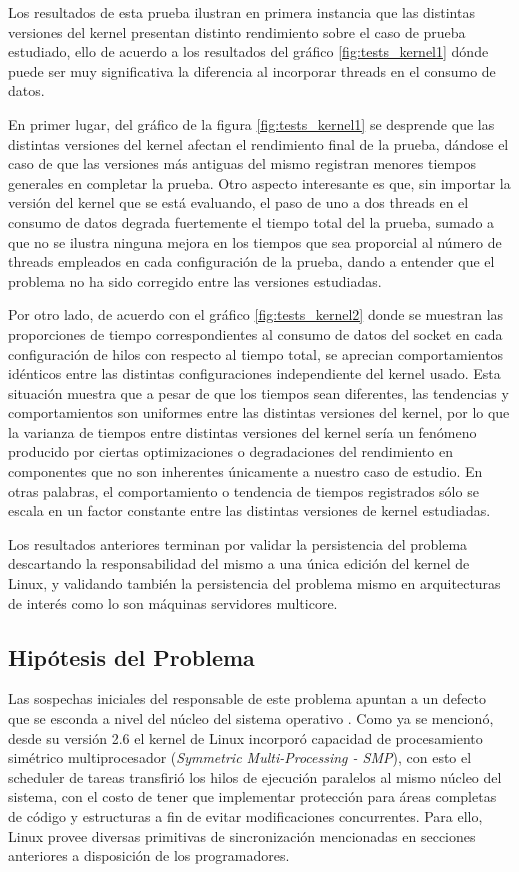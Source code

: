 Los resultados de esta prueba ilustran en primera instancia que las distintas versiones del kernel presentan distinto rendimiento sobre el caso de prueba estudiado, ello de acuerdo a los resultados del gráfico \ref{fig:tests_kernel1} dónde puede ser muy significativa la diferencia al incorporar threads en el consumo de datos.

En primer lugar, del gráfico de la figura \ref{fig:tests_kernel1} se desprende que las distintas versiones del kernel afectan el rendimiento final de la prueba, dándose el caso de que las versiones más antiguas del mismo registran menores tiempos generales en completar la prueba. Otro aspecto interesante es que, sin importar la versión del kernel que se está evaluando, el paso de uno a dos threads en el consumo de datos degrada fuertemente el tiempo total del la prueba, sumado a que no se ilustra ninguna mejora en los tiempos que sea proporcial al número de threads empleados en cada configuración de la prueba, dando a entender que el problema no ha sido corregido entre las versiones estudiadas.

Por otro lado, de acuerdo con el gráfico \ref{fig:tests_kernel2} donde se muestran las proporciones de tiempo correspondientes al consumo de datos del socket en cada configuración de hilos con respecto al tiempo total, se aprecian comportamientos idénticos entre las distintas configuraciones independiente del kernel usado. Esta situación muestra que a pesar de que los tiempos sean diferentes, las tendencias y comportamientos son uniformes entre las distintas versiones del kernel, por lo que la varianza de tiempos entre distintas versiones del kernel sería un fenómeno producido por ciertas optimizaciones o degradaciones del rendimiento en componentes que no son inherentes únicamente a nuestro caso de estudio. En otras palabras, el comportamiento o tendencia de tiempos registrados sólo se escala en un factor constante entre las distintas versiones de kernel estudiadas.

Los resultados anteriores terminan por validar la persistencia del problema descartando la responsabilidad del mismo a una única edición del kernel de Linux, y validando también la persistencia del problema mismo en arquitecturas de interés como lo son máquinas servidores multicore.

\subsection{Hipótesis del Problema}
Las sospechas iniciales del responsable de este problema apuntan a un defecto que se esconda a nivel del núcleo del sistema operativo \cite{paper:toshiba,post:facebook}. Como ya se mencionó, desde su versión 2.6 el kernel de Linux incorporó capacidad de procesamiento simétrico multiprocesador (\emph{Symmetric Multi-Processing - SMP}), con esto el scheduler de tareas transfirió los hilos de ejecución paralelos al mismo núcleo del sistema, con el costo de tener que implementar protección para áreas completas de código y estructuras a fin de evitar modificaciones concurrentes. Para ello, Linux provee diversas primitivas de sincronización mencionadas en secciones anteriores a disposición de los programadores.


